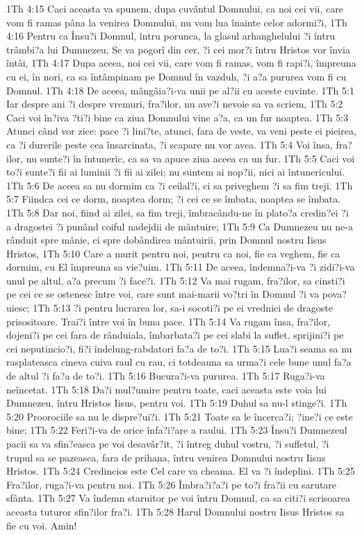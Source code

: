 1Th 4:15  Caci aceasta va spunem, dupa cuvântul Domnului, ca noi cei vii, care vom fi ramas pâna la venirea Domnului, nu vom lua înainte celor adormi?i,
1Th 4:16  Pentru ca Însu?i Domnul, întru porunca, la glasul arhanghelului ?i întru trâmbi?a lui Dumnezeu, Se va pogorî din cer, ?i cei mor?i întru Hristos vor învia întâi,
1Th 4:17  Dupa aceea, noi cei vii, care vom fi ramas, vom fi rapi?i, împreuna cu ei, în nori, ca sa întâmpinam pe Domnul în vazduh, ?i a?a pururea vom fi cu Domnul.
1Th 4:18  De aceea, mângâia?i-va unii pe al?ii cu aceste cuvinte.
1Th 5:1  Iar despre ani ?i despre vremuri, fra?ilor, nu ave?i nevoie sa va scriem,
1Th 5:2  Caci voi în?iva ?ti?i bine ca ziua Domnului vine a?a, ca un fur noaptea.
1Th 5:3  Atunci când vor zice: pace ?i lini?te, atunci, fara de veste, va veni peste ei pieirea, ca ?i durerile peste cea însarcinata, ?i scapare nu vor avea.
1Th 5:4  Voi însa, fra?ilor, nu sunte?i în întuneric, ca sa va apuce ziua aceea ca un fur.
1Th 5:5  Caci voi to?i sunte?i fii ai luminii ?i fii ai zilei; nu suntem ai nop?ii, nici ai întunericului.
1Th 5:6  De aceea sa nu dormim ca ?i ceilal?i, ci sa priveghem ?i sa fim treji.
1Th 5:7  Fiindca cei ce dorm, noaptea dorm; ?i cei ce se îmbata, noaptea se îmbata.
1Th 5:8  Dar noi, fiind ai zilei, sa fim treji, îmbracându-ne în plato?a credin?ei ?i a dragostei ?i punând coiful nadejdii de mântuire;
1Th 5:9  Ca Dumnezeu nu ne-a rânduit spre mânie, ci spre dobândirea mântuirii, prin Domnul nostru Iisus Hristos,
1Th 5:10  Care a murit pentru noi, pentru ca noi, fie ca veghem, fie ca dormim, cu El împreuna sa vie?uim.
1Th 5:11  De aceea, îndemna?i-va ?i zidi?i-va unul pe altul, a?a precum ?i face?i.
1Th 5:12  Va mai rugam, fra?ilor, sa cinsti?i pe cei ce se ostenesc între voi, care sunt mai-marii vo?tri în Domnul ?i va pova?uiesc;
1Th 5:13  ?i pentru lucrarea lor, sa-i socoti?i pe ei vrednici de dragoste prisositoare. Trai?i între voi în buna pace.
1Th 5:14  Va rugam însa, fra?ilor, dojeni?i pe cei fara de rânduiala, îmbarbata?i pe cei slabi la suflet, sprijini?i pe cei neputincio?i, fi?i îndelung-rabdatori fa?a de to?i.
1Th 5:15  Lua?i seama sa nu rasplateasca cineva cuiva raul cu rau, ci totdeauna sa urma?i cele bune unul fa?a de altul ?i fa?a de to?i.
1Th 5:16  Bucura?i-va pururea.
1Th 5:17  Ruga?i-va neîncetat.
1Th 5:18  Da?i mul?umire pentru toate, caci aceasta este voia lui Dumnezeu, întru Hristos Iisus, pentru voi.
1Th 5:19  Duhul sa nu-l stinge?i.
1Th 5:20  Proorociile sa nu le dispre?ui?i.
1Th 5:21  Toate sa le încerca?i; ?ine?i ce este bine;
1Th 5:22  Feri?i-va de orice înfa?i?are a raului.
1Th 5:23  Însu?i Dumnezeul pacii sa va sfin?easca pe voi desavâr?it, ?i întreg duhul vostru, ?i sufletul, ?i trupul sa se pazeasca, fara de prihana, întru venirea Domnului nostru Iisus Hristos.
1Th 5:24  Credincios este Cel care va cheama. El va ?i îndeplini.
1Th 5:25  Fra?ilor, ruga?i-va pentru noi.
1Th 5:26  Îmbra?i?a?i pe to?i fra?ii cu sarutare sfânta.
1Th 5:27  Va îndemn staruitor pe voi întru Domnul, ca sa citi?i scrisoarea aceasta tuturor sfin?ilor fra?i.
1Th 5:28  Harul Domnului nostru Iisus Hristos sa fie cu voi. Amin!


